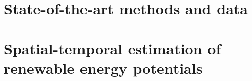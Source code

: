 %
%
%






\setlength{\parindent}{0pt}
\setlength{\parskip}{0pt} %
\setlength{\textfloatsep}{10pt plus 1.0pt minus 2.0pt}
\renewcommand{\arraystretch}{1.2} %
\frontmatter

% 
\setcounter{page}{0}
% 
% 
% 

\cleardoublepage
{}
\tableofcontents

\cleardoublepage
{}
{} %
\listoffigures
% 
\cleardoublepage
{}
{} %
\listoftables

\cleardoublepage
{}
{} %


\setlength{\parskip}{1em}


\nobibliography*
\mainmatter

\cleardoublepage

\part{State-of-the-art methods and data}
\label{methods}

\cleardoublepage

\cleardoublepage

\cleardoublepage

\part{Spatial-temporal estimation of renewable energy potentials}
\label{potential}

\cleardoublepage

\cleardoublepage

